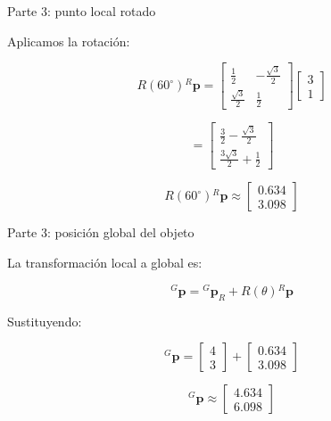 \documentclass[aspectratio=169]{beamer}
\begin{document}
\begin{frame}{Parte 3: punto local rotado}

    Aplicamos la rotación:

    \[
    R(60^\circ)
    {}^{R}\mathbf{p}
    =
    \begin{bmatrix}
        \frac{1}{2} & -\frac{\sqrt{3}}{2}\\
        \frac{\sqrt{3}}{2} & \frac{1}{2}
    \end{bmatrix}
    \begin{bmatrix}
        3\\
        1
    \end{bmatrix}
    \]

    \[
    =
    \begin{bmatrix}
        \frac{3}{2}-\frac{\sqrt{3}}{2}\\
        \frac{3\sqrt{3}}{2}+\frac{1}{2}
    \end{bmatrix}
    \]

    \[
    \boxed{
        R(60^\circ)
        {}^{R}\mathbf{p}
        \approx
        \begin{bmatrix}
            0.634\\
            3.098
    \end{bmatrix}}
    \]

\end{frame}

\begin{frame}{Parte 3: posición global del objeto}

    La transformación local a global es:

    \[
    {}^{G}\mathbf{p}
    =
    {}^{G}\mathbf{p}_R
    +
    R(\theta)
    {}^{R}\mathbf{p}
    \]

    Sustituyendo:

    \[
    {}^{G}\mathbf{p}
    =
    \begin{bmatrix}
        4\\
        3
    \end{bmatrix}
    +
    \begin{bmatrix}
        0.634\\
        3.098
    \end{bmatrix}
    \]

    \[
    \boxed{
        {}^{G}\mathbf{p}
        \approx
        \begin{bmatrix}
            4.634\\
            6.098
    \end{bmatrix}}
    \]

\end{frame}
\end{document}
